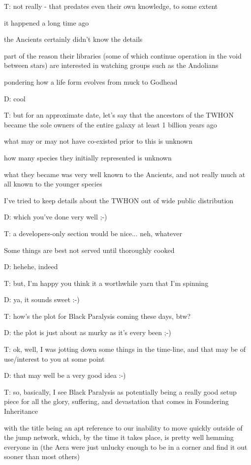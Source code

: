 {T: not really - that predates even their own knowledge, to some extent

it happened a long time ago

the Ancients certainly didn't know the details

part of the reason their libraries (some of which continue operation in the void between stars) are interested in watching groups such as the Andolians

pondering how a life form evolves from muck to Godhead

D: cool

T: but for an approximate date, let's say that the ancestors of the TWHON became the sole owners of the entire galaxy at least 1 billion years ago

what may or may not have co-existed prior to this is unknown

how many species they initially represented is unknown

what they became was very well known to the Ancients, and not really much at all known to the younger species

I've tried to keep details about the TWHON out of wide public distribution

D: which you've done very well ;-)

T: a developers-only section would be nice... neh, whatever

Some things are best not served until thoroughly cooked

D: hehehe, indeed

T: but, I'm happy you think it a worthwhile yarn that I'm spinning

D: ya, it sounds sweet :-)

T: how's the plot for Black Paralysis coming these days, btw?

D: the plot is just about as murky as it's every been ;-)

T: ok, well, I was jotting down some things in the time-line, and that may be of use/interest to you at some point

D: that may well be a very good idea :-)

T: so, basically, I see Black Paralysis as potentially being a really good setup piece for all the glory, suffering, and devastation that comes in Foundering Inheritance

with the title being an apt reference to our inability to move quickly outside of the jump network, which, by the time it takes place, is pretty well hemming everyone in (the Aera were just unlucky enough to be in a corner and find it out sooner than most others)

}
